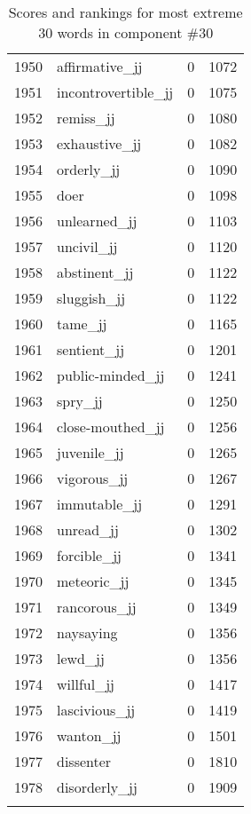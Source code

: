\begin{longtable}[!htbp]{| rlr@{.}l |}
    1950 & affirmative\_jj & 0 & 1072 \\
    1951 & incontrovertible\_jj & 0 & 1075 \\
    1952 & remiss\_jj & 0 & 1080 \\
    1953 & exhaustive\_jj & 0 & 1082 \\
    1954 & orderly\_jj & 0 & 1090 \\
    1955 & doer & 0 & 1098 \\
    1956 & unlearned\_jj & 0 & 1103 \\
    1957 & uncivil\_jj & 0 & 1120 \\
    1958 & abstinent\_jj & 0 & 1122 \\
    1959 & sluggish\_jj & 0 & 1122 \\
    1960 & tame\_jj & 0 & 1165 \\
    1961 & sentient\_jj & 0 & 1201 \\
    1962 & public-minded\_jj & 0 & 1241 \\
    1963 & spry\_jj & 0 & 1250 \\
    1964 & close-mouthed\_jj & 0 & 1256 \\
    1965 & juvenile\_jj & 0 & 1265 \\
    1966 & vigorous\_jj & 0 & 1267 \\
    1967 & immutable\_jj & 0 & 1291 \\
    1968 & unread\_jj & 0 & 1302 \\
    1969 & forcible\_jj & 0 & 1341 \\
    1970 & meteoric\_jj & 0 & 1345 \\
    1971 & rancorous\_jj & 0 & 1349 \\
    1972 & naysaying & 0 & 1356 \\
    1973 & lewd\_jj & 0 & 1356 \\
    1974 & willful\_jj & 0 & 1417 \\
    1975 & lascivious\_jj & 0 & 1419 \\
    1976 & wanton\_jj & 0 & 1501 \\
    1977 & dissenter & 0 & 1810 \\
    1978 & disorderly\_jj & 0 & 1909 \\
    \hline
    \caption{Scores and rankings for most extreme 30 words in component \#30} \\
\end{longtable}
